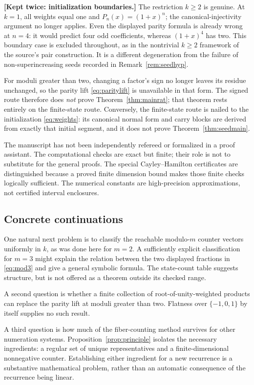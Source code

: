 \documentclass[11pt,letterpaper]{article}
\numberwithin{equation}{section}
\theoremstyle{definition}
\theoremstyle{remark}
\begin{document}
\noindent\textbf{[Kept twice: initialization boundaries.]}
The restriction $k\ge2$ is genuine. At $k=1$, all weights equal one and
$P_n(x)=(1+x)^n$; the canonical-injectivity argument no longer applies.
Even the displayed parity formula is already wrong at $n=4$: it would
predict four odd coefficients, whereas $(1+x)^4$ has two. This boundary case
is excluded throughout, as in the nontrivial $k\ge2$ framework of the
source's pair construction. It is a different degeneration from the failure
of non-superincreasing seeds recorded in Remark~\ref{rem:seedhyp}.

For moduli greater than two, changing a factor's sign no longer leaves its
residue unchanged, so the parity lift \eqref{eq:paritylift} is unavailable
in that form. The signed route therefore does \emph{not} prove
Theorem~\ref{thm:mainrat}; that theorem rests entirely on the finite-state
route. Conversely, the finite-state route is nailed to the initialization
\eqref{eq:weights}: its canonical normal form and carry blocks are derived
from exactly that initial segment, and it does not prove
Theorem~\ref{thm:seedmain}.

The manuscript has not been independently refereed or formalized in a
proof assistant. The computational checks are exact but finite; their
role is not to substitute for the general proofs. The special
Cayley--Hamilton certificates are distinguished because a proved finite
dimension bound makes those finite checks logically sufficient.
The numerical constants are high-precision approximations, not certified
interval enclosures.

\subsection{Concrete continuations}

One natural next problem is to classify the reachable modulo-$m$ counter
vectors uniformly in $k$, as was done here for $m=2$. A sufficiently
explicit classification for $m=3$ might explain the relation between the
two displayed fractions in \eqref{eq:mod3} and give a general symbolic
formula. The state-count table suggests structure, but is not offered
as a theorem outside its checked range.

A second question is whether a finite collection of root-of-unity-weighted
products can replace the parity lift at moduli greater than two. Flatness
over $\{-1,0,1\}$ by itself supplies no such result.

A third question is how much of the fiber-counting method survives for
other numeration systems. Proposition~\ref{prop:principle} isolates the
necessary ingredients: a regular set of unique representatives and a
finite-dimensional nonnegative counter. Establishing either ingredient
for a new recurrence is a substantive mathematical problem, rather than
an automatic consequence of the recurrence being linear.
\end{document}
